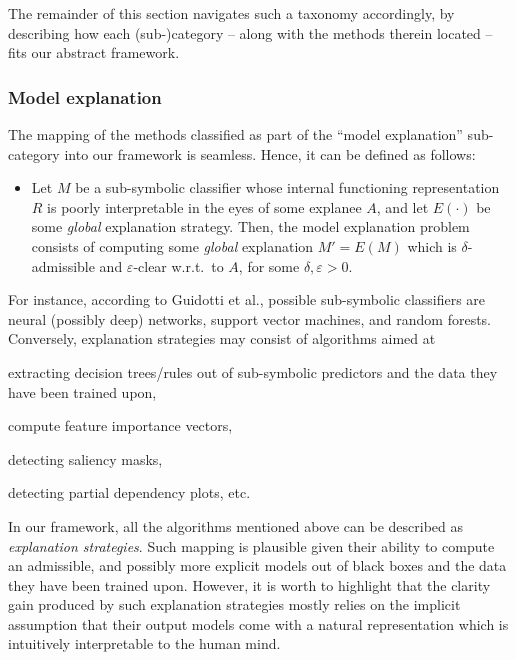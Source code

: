 \documentclass[12pt,a4paper,openright,twoside]{book}
\begin{document}
The remainder of this section navigates such a taxonomy accordingly, by describing how each (sub-)category -- along with the methods therein located -- fits our abstract framework.

\subsubsection{Model explanation}

The mapping of the methods classified as part of the ``model explanation'' sub-category into our framework is seamless.
%
Hence, it can be defined as follows:
%
\begin{itemize}
    \item[] Let $M$ be a sub-symbolic classifier whose internal functioning representation $R$ is poorly interpretable in the eyes of some explanee $A$, and let $E(\cdot)$ be some \emph{global} explanation strategy.
    Then, the model explanation problem consists of computing some \emph{global} explanation $M' = E(M)$ which is $\delta$-admissible and $\varepsilon$-clear w.r.t.\ to $A$, for some $\delta, \varepsilon > 0$.
\end{itemize}
%
For instance, according to Guidotti et al., possible sub-symbolic classifiers are neural (possibly deep) networks, support vector machines, and random forests.
%
Conversely, explanation strategies may consist of algorithms aimed at
%
\begin{enumerate*}[label=\emph{(\roman{*})}]
    \item extracting decision trees/rules out of sub-symbolic predictors and the data they have been trained upon,
    \item compute feature importance vectors,
    \item detecting saliency masks,
    \item detecting partial dependency plots, etc.
\end{enumerate*}

In our framework, all the algorithms mentioned above can be described as \emph{explanation strategies}.
%
Such mapping is plausible given their ability to compute an admissible, and possibly more explicit models out of black boxes and the data they have been trained upon.
%
However, it is worth to highlight that the clarity gain produced by such explanation strategies mostly relies on the implicit assumption that their output models come with a natural representation which is intuitively interpretable to the human mind.
\end{document}
